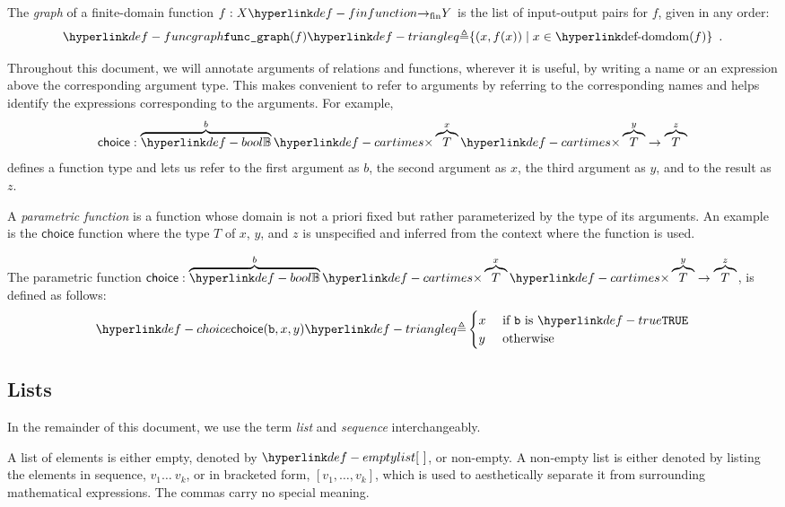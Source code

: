 \begin{definition}
\hypertarget{def-funcgraph}{}
The \emph{graph} of a finite-domain function $f : X \rightarrowfin Y$
is the list of input-output pairs for $f$, given in any order:
\[
\funcgraph(f) \triangleq \{ (x, f(x)) \;|\; x \in \dom(f) \} \enspace.
\]
\end{definition}

Throughout this document, we will annotate arguments of relations and functions, wherever it is useful,
by writing a name or an expression above the corresponding argument type.
This makes convenient to refer to arguments by referring to the corresponding names and helps identify
the expressions corresponding to the arguments.
For example,
\[
    \textsf{choice} : \overname{\Bool}{b} \cartimes \overname{T}{x} \cartimes \overname{T}{y} \rightarrow \overname{T}{z}
\]
defines a function type and lets us refer to the first argument as $b$, the second argument as $x$,
the third argument as $y$, and to the result as $z$.

A \emph{parametric function} is a function whose domain is not a priori fixed but rather
parameterized by the type of its arguments. An example is the $\textsf{choice}$ function where the type $T$ of
$x$, $y$, and $z$ is unspecified and inferred from the context where the function is used.

\hypertarget{def-choice}{}
\begin{definition}[Choice]
The parametric function $\textsf{choice} : \overname{\Bool}{b} \cartimes \overname{T}{x} \cartimes \overname{T}{y} \rightarrow \overname{T}{z}$,
is defined as follows:
\[
  \choice{\vb}{x}{y} \triangleq
  \begin{cases}
    x & \text{ if }\vb \text{ is }\True\\
    y & \text{ otherwise}\\
  \end{cases}
\]
\end{definition}

\subsection{Lists}
In the remainder of this document, we use the term \emph{list} and \emph{sequence} interchangeably.

A list of elements \hypertarget{def-emptylist}{is either empty, denoted by $\emptylist$}, or non-empty.
A non-empty list is either denoted by listing the elements in sequence, $v_1 \ldots\ v_k$,
or in bracketed form, $[v_1,\ldots,v_k]$, which is used to aesthetically separate it from surrounding mathematical expressions.
The commas carry no special meaning.

